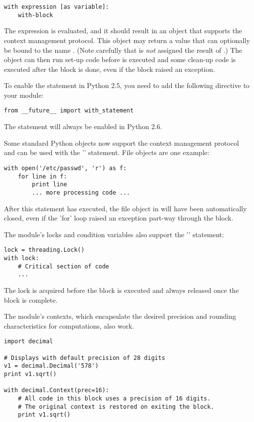 \documentclass{howto}
\begin{document}
\begin{verbatim}
with expression [as variable]:
    with-block
\end{verbatim}

The expression is evaluated, and it should result in an object that
supports the context management protocol.  This object may return a
value that can optionally be bound to the name .  (Note
carefully that  is \emph{not} assigned the result of
.)  The object can then run set-up code
before  is executed and some clean-up code
is executed after the block is done, even if the block raised an exception.

To enable the statement in Python 2.5, you need 
to add the following directive to your module:

\begin{verbatim}
from __future__ import with_statement
\end{verbatim}

The statement will always be enabled in Python 2.6.

Some standard Python objects now support the context management
protocol and can be used with the '' statement. File
objects are one example:

\begin{verbatim}
with open('/etc/passwd', 'r') as f:
    for line in f:
        print line
        ... more processing code ...
\end{verbatim}

After this statement has executed, the file object in  will
have been automatically closed, even if the 'for' loop
raised an exception part-way through the block.

The  module's locks and condition variables 
also support the '' statement:

\begin{verbatim}
lock = threading.Lock()
with lock:
    # Critical section of code
    ...
\end{verbatim}

The lock is acquired before the block is executed and always released once 
the block is complete.

The  module's contexts, which encapsulate the desired
precision and rounding characteristics for computations, also work.

\begin{verbatim}
import decimal

# Displays with default precision of 28 digits
v1 = decimal.Decimal('578')
print v1.sqrt()

with decimal.Context(prec=16):
    # All code in this block uses a precision of 16 digits.
    # The original context is restored on exiting the block.
    print v1.sqrt()
\end{verbatim}
\end{document}
